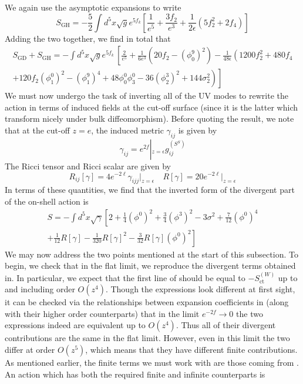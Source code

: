\documentclass{article}
\begin{document}
We again use the asymptotic expansions to write
\[
S_{\mathrm{GH}}=-\frac{5}{2} \int d^{5}x \sqrt{g} e^{5 f_{k}}\left[\frac{1}{e^{5}}+\frac{3 f_{2}}{e^{3}}+\frac{1}{2 \epsilon}\left(5 f_{2}^{2}+2 f_{4}\right)\right]
\]
Adding the two together, we find in total that
\[
\begin{array}{l}
S_{\mathrm{GD}}+S_{\mathrm{GH}}=-\int d^{5}x \sqrt{g} e^{5 f_{k}}\,\left[\frac{2}{e^{5}}+\frac{1}{6 e^{3}}\left(20 f_{2}-\left(\phi_{0}^{9}\right)^{2}\right)-\frac{1}{48 \epsilon}\left(1200 f_{2}^{2}+480 f_{4}\right.\right. \\
\left.\left.+\left.120 f_{2}\left(\phi_{1}^{0}\right)^{2}-\left(\phi_{1}^{9}\right)^{4}+48 \phi_{0}^{0} \phi_{3}^{0}-36\left(\phi_{2}^{3}\right)^{2}+144 \sigma_{2}^{2}\right)\right]
\end{array}
\]
We must now undergo the task of inverting all of the UV modes to rewrite the action in terms of induced fields at the cut-off surface (since it is the latter which transform nicely under bulk diffeomorphism). Before quoting the result, we note that at the cut-off \(z=e\), the induced metric \(\gamma_{i j}\) is given by
\[
\gamma_{i j}=e^{2 f}\left|_{z=\epsilon} g_{i j}^{(S^{S})}\right.
\]
The Ricci tensor and Ricci scalar are given by
\[
R_{i j}[\gamma]=4 e^{-2 \ell} \gamma_{i j j}\big|_{z=\epsilon} \quad R[\gamma]=20 e^{-2 \ell}\big|_{z=\epsilon}
\]
In terms of these quantities, we find that the inverted form of the divergent part of the on-shell action is
\[
\begin{array}{l}
S=-\int d^{5}x \sqrt{\gamma}\left[2+\frac{1}{4}\left(\phi^{0}\right)^{2}+\frac{3}{4}\left(\phi^{3}\right)^{2}-3 \sigma^{2}+\frac{7}{12}\left(\phi^{0}\right)^{4}\right. \\
\left.+\frac{1}{12} R[\gamma]-\frac{1}{320} R[\gamma]^{2}-\frac{3}{32} R[\gamma]\left(\phi^{0}\right)^{2}\right]
\end{array}
\]
We may now address the two points mentioned at the start of this subsection. To begin, we check that in the flat limit, we reproduce the divergent terms obtained in. In particular, we expect that the first line of should be equal to \(-S_{\mathrm{ct}}^{(W)}\) up to and including order \(O\left(z^{4}\right)\). Though the expressions look different at first sight, it can be checked via the relationships between expansion coefficients in (along with their higher order counterparts) that in the limit \(e^{-2 f} \rightarrow 0\) the two expressions indeed are equivalent up to \(O\left(z^{4}\right)\). Thus all of their divergent contributions are the same in the flat limit. However, even in this limit the two differ at order \(O\left(z^{5}\right)\), which means that they have different finite contributions. As mentioned earlier, the finite terms we must work with are those coming from . An action which has both the required finite and infinite counterparts is
\end{document}
